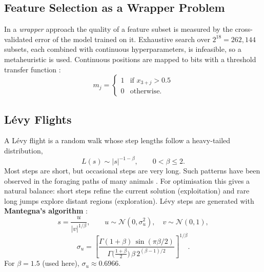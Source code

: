 \documentclass[12pt,a4paper]{article}
\numberwithin{equation}{section}
\numberwithin{table}{section}
\numberwithin{figure}{section}
\begin{document}
\subsection{Feature Selection as a Wrapper Problem}
In a \emph{wrapper} approach the quality of a feature subset is measured by the cross-validated error of the model trained on it. Exhaustive search over $2^{18} = 262{,}144$ subsets, each combined with continuous hyperparameters, is infeasible, so a metaheuristic is used. Continuous positions are mapped to bits with a threshold transfer function \cite{mirjalili2013}:
\begin{equation}
  m_j = \begin{cases} 1 & \text{if } x_{3+j} > 0.5 \\ 0 & \text{otherwise.}\end{cases}
\end{equation}

\subsection{Lévy Flights}
A Lévy flight is a random walk whose step lengths follow a heavy-tailed distribution,
\begin{equation}
  L(s) \sim |s|^{-1-\beta}, \qquad 0 < \beta \le 2 .
\end{equation}
Most steps are short, but occasional steps are very long. Such patterns have been observed in the foraging paths of many animals \cite{yang2010book}. For optimisation this gives a natural balance: short steps refine the current solution (exploitation) and rare long jumps explore distant regions (exploration). Lévy steps are generated with \textbf{Mantegna's algorithm} \cite{mantegna1994}:
\begin{equation}
  s = \frac{u}{|v|^{1/\beta}}, \qquad u \sim \mathcal{N}(0, \sigma_u^2), \quad v \sim \mathcal{N}(0, 1),
\end{equation}
\begin{equation}
  \sigma_u = \left[ \frac{\Gamma(1+\beta)\, \sin(\pi\beta/2)}{\Gamma\!\big(\frac{1+\beta}{2}\big)\, \beta\, 2^{(\beta-1)/2}} \right]^{1/\beta}.
\end{equation}
For $\beta = 1.5$ (used here), $\sigma_u \approx 0.6966$.
\end{document}
